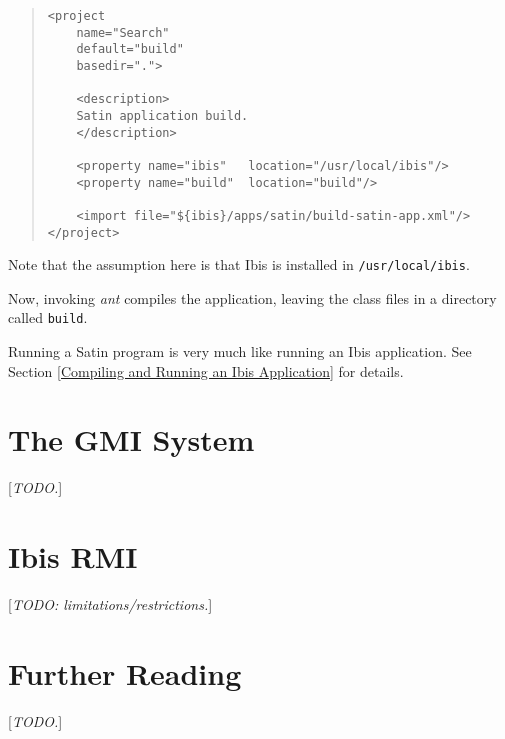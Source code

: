 \documentclass[10pt]{article}
\newcommand{\mysection}[1]{\section{#1}\label{#1}}
\newcommand{\remark}[1]{[\emph{#1}]}
\begin{document}
\begin{quote}
\begin{verbatim}
<project
    name="Search"
    default="build"
    basedir=".">

    <description>
    Satin application build.
    </description>

    <property name="ibis"   location="/usr/local/ibis"/>
    <property name="build"  location="build"/>

    <import file="${ibis}/apps/satin/build-satin-app.xml"/>
</project>
\end{verbatim}
\end{quote}
Note that the assumption here is that Ibis is installed in
\verb+/usr/local/ibis+.

Now, invoking \emph{ant} compiles the application, leaving the class files
in a directory called \verb+build+.

Running a Satin program is very much like running an Ibis application.
See Section \ref{Compiling and Running an Ibis Application} for details.

\mysection{The GMI System}

\remark{TODO.}

\mysection{Ibis RMI}

\remark{TODO: limitations/restrictions.}

\mysection{Further Reading}

\remark{TODO.}
\end{document}
